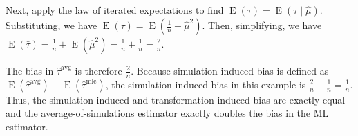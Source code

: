 \documentclass[12pt]{article}
\DeclareMathOperator*{\E}{\text{E}}
\begin{document}
Next, apply the law of iterated expectations to find $\E(\bar{\tau}) = \E(\bar{\tau} \mid \hat{\mu})$. Substituting, we have $\E(\bar{\tau}) = \E(\frac{1}{n} + \hat{\mu}^2)$. Then, simplifying, we have $\E(\bar{\tau}) = \frac{1}{n} + \E(\hat{\mu}^2) = \frac{1}{n} + \frac{1}{n} = \frac{2}{n}$.

The bias in $\hat{\tau}^\text{avg}$ is therefore $\frac{2}{n}$. Because simulation-induced bias is defined as $\E\left(\hat{\tau}^\text{avg} \right) - \E\left(\hat{\tau}^\text{mle} \right)$, the simulation-induced bias in this example is $\frac{2}{n} - \frac{1}{n} = \frac{1}{n}$. Thus, the simulation-induced and transformation-induced bias are exactly equal and the average-of-simulations estimator exactly doubles the bias in the ML estimator.


\singlespace
\small


\end{document}
